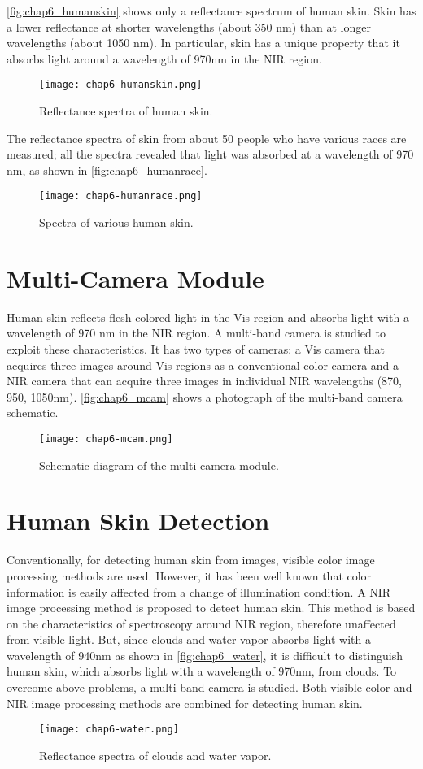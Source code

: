 \autoref{fig:chap6_humanskin} shows only a reflectance spectrum of human
skin. Skin has a lower reflectance at shorter wavelengths (about 350 nm) than at 
longer wavelengths (about 1050 nm). In particular, skin has a unique
property that it absorbs light around a wavelength of 970nm in the NIR region. 
\begin{figure}[ht]
  \centering
    \texttt{[image: chap6-humanskin.png]}
  \caption{Reflectance spectra of human skin.}
  \label{fig:chap6_humanskin}
\end{figure}

The reflectance spectra of skin from about 50 people who have various
races are measured; all the spectra revealed that light was absorbed
at a wavelength of 970 nm, as shown in \autoref{fig:chap6_humanrace}.

\begin{figure}[ht]
  \centering
    \texttt{[image: chap6-humanrace.png]}
  \caption{Spectra of various human skin.}
  \label{fig:chap6_humanrace}
\end{figure}

\section{Multi-Camera Module}
Human skin reflects flesh-colored light in the Vis region and absorbs light 
with a wavelength of 970 nm in the NIR region. A multi-band camera is studied to
exploit these characteristics. It has two types of cameras: a Vis camera that 
acquires three images around Vis regions as a conventional color camera and 
a NIR camera that can acquire three images in individual NIR wavelengths (870, 950,
1050nm). \autoref{fig:chap6_mcam} shows a photograph of the multi-band camera schematic.

\begin{figure}[hb]
  \centering
    \texttt{[image: chap6-mcam.png]}
  \caption{Schematic diagram of the multi-camera module.}
  \label{fig:chap6_mcam}
\end{figure}

\section {Human Skin Detection}
Conventionally, for detecting human skin from images, 
visible color image processing methods are used.
However, it has been well known that color information is easily affected 
from a change of illumination condition. A NIR image processing method is proposed 
to detect human skin. This method is based on the characteristics of spectroscopy
around NIR region, therefore unaffected from visible
light. But, since clouds and water vapor absorbs light
with a wavelength of 940nm as shown in \autoref{fig:chap6_water}, 
it is difficult to distinguish human skin, which absorbs light with a wavelength 
of 970nm, from clouds. To overcome above problems, a multi-band camera is studied.
Both visible color and NIR image processing methods are combined for detecting 
human skin.

\begin{figure}[hb]
  \centering
	\texttt{[image: chap6-water.png]}
  \caption{Reflectance spectra of clouds and water vapor.}
  \label{fig:chap6_water}
\end{figure}
